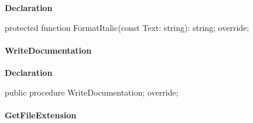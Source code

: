 \documentclass{report}
\newif\ifpdf
\begin{document}
\label{PasDoc_GenSimpleXML.TSimpleXMLDocGenerator-FormatItalic}
\begin{list}{}{
\setlength{\itemindent}{0cm}
\setlength{\listparindent}{0cm}
\setlength{\leftmargin}{\evensidemargin}
\addtolength{\leftmargin}{\tmplength}
\settowidth{\labelsep}{X}
\addtolength{\leftmargin}{\labelsep}
\setlength{\labelwidth}{\tmplength}
}
\item[\textbf{Declaration}\hfill]
\ifpdf
\begin{flushleft}
\fi
\begin{ttfamily}
protected function FormatItalic(const Text: string): string; override;\end{ttfamily}

\ifpdf
\end{flushleft}
\fi

\end{list}
\paragraph*{WriteDocumentation}\hspace*{\fill}

\label{PasDoc_GenSimpleXML.TSimpleXMLDocGenerator-WriteDocumentation}
\begin{list}{}{
\setlength{\itemindent}{0cm}
\setlength{\listparindent}{0cm}
\setlength{\leftmargin}{\evensidemargin}
\addtolength{\leftmargin}{\tmplength}
\settowidth{\labelsep}{X}
\addtolength{\leftmargin}{\labelsep}
\setlength{\labelwidth}{\tmplength}
}
\item[\textbf{Declaration}\hfill]
\ifpdf
\begin{flushleft}
\fi
\begin{ttfamily}
public procedure WriteDocumentation; override;\end{ttfamily}

\ifpdf
\end{flushleft}
\fi

\end{list}
\paragraph*{GetFileExtension}\hspace*{\fill}
\end{document}
